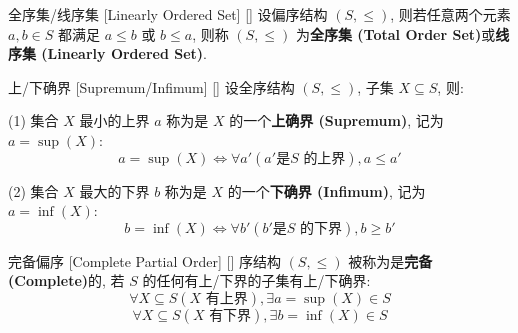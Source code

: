 \documentclass[UTF8]{ctexart}
\begin{document}
			\begin{dfn}
			    []
			    {全序集/线序集}
			    [Linearly Ordered Set]
			    []
				设偏序结构 \((S,\leq)\), 则若任意两个元素 \(a,b\in S\) 都满足 \(a\leq b\) 或 \(b\leq a\), 则称 \((S,\leq)\) 为\textbf{全序集 (Total Order Set)}或\textbf{线序集 (Linearly Ordered Set)}. 
			\end{dfn}
			
			\begin{dfn}
			    []
			    {上/下确界}
			    [Supremum/Infimum]
			    []
				设全序结构 \((S,\leq)\), 子集 \(X\subseteq S\), 则: 
				
				(1) 集合 \(X\) 最小的上界 \(a\) 称为是 \(X\) 的一个\textbf{上确界  (Supremum)}, 记为 \(a=\sup(X)\): 
				\[a=\sup(X)\iff\forall a'(a' \text{是} S\text{ 的上界}), a\leq a'\]
				
				(2) 集合 \(X\) 最大的下界 \(b\) 称为是 \(X\) 的一个\textbf{下确界  (Infimum)}, 记为 \(a=\inf(X)\): 
				\[b=\inf(X)\iff\forall b'(b' \text{是} S\text{ 的下界}), b\geq b'\]
			\end{dfn}
			
			\begin{dfn}
			    []
			    {完备偏序}
			    [Complete Partial Order]
			    []
				序结构 \((S,\leq)\) 被称为是\textbf{完备 (Complete)}的, 若 \(S\) 的任何有上/下界的子集有上/下确界: 
				\[\forall X\subseteq S(X\text{ 有上界}), \exists a=\sup(X)\in S\]
				\[\forall X\subseteq S(X\text{ 有下界}), \exists b=\inf(X)\in S\]
			\end{dfn}
    
\end{document}
